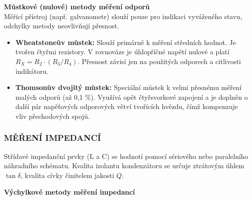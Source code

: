         \textbf{Můstkové (nulové) metody měření odporů}\\
        Měřicí přístroj (např. galvanometr) slouží pouze pro indikaci vyváženého stavu, odchylky metody neovlivňují přesnost.
        
        \begin{itemize}
            \item \textbf{Wheatstoneův můstek:} Slouží primárně k měření středních hodnot. Je tvořen čtyřmi rezistory. V rovnováze je úhlopříčné napětí nulové a platí $R_X = R_2 \cdot (R_3 / R_4)$. Přesnost závisí jen na použitých odporech a citlivosti indikátoru.
            \item \textbf{Thomsonův dvojitý můstek:} Speciální můstek k velmi přesnému měření malých odporů (až 0,1 \%). Využívá opět čtyřsvorkové zapojení a je doplněn o další pár napěťových odporových větví tvořících hvězdu, čímž kompenzuje vliv přechodových spojů.
        \end{itemize}
    \subsubsection{MĚŘENÍ IMPEDANCÍ}

        Střídavé impedanční prvky (L a C) se hodnotí pomocí sériového nebo paralelního náhradního schématu. Kvalita izolantu kondenzátoru se určuje ztrátovým úhlem $\tan \delta$, kvalita cívky činitelem jakosti $Q$.
        
        \textbf{Výchylkové metody měření impedancí}
        
